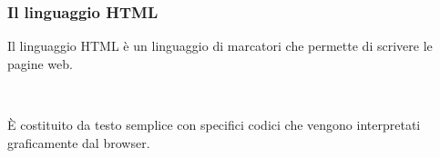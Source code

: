 \documentclass[]{beamer}
\begin{document}




\begin{frame}
\frametitle{Il linguaggio HTML}
Il linguaggio HTML è un \alert<1>{linguaggio di marcatori} che permette di scrivere le pagine web.\pause

~

È costituito da testo semplice con specifici codici che vengono \alert<2>{interpretati graficamente} dal browser.

\begin{columns}
  \begin{column}{0.45\textwidth}
  \begin{figure}
  \end{figure}
  \end{column}
  \begin{column}{0.45\textwidth}
  \begin{figure}
\end{figure}
\end{column}
\end{columns}
\end{frame}
\end{document}
